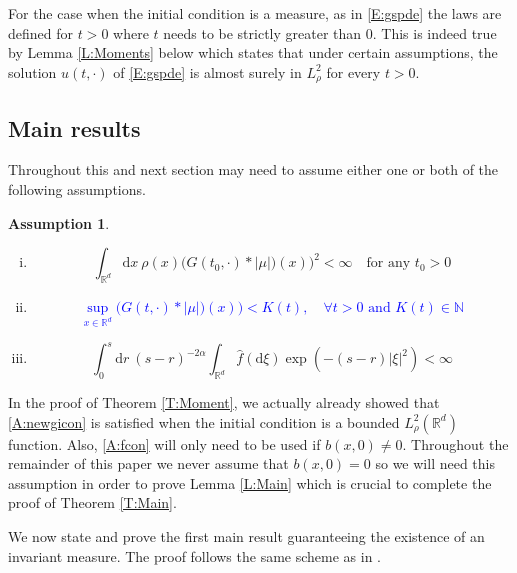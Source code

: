 \documentclass[a4paper,11pt]{article}
\numberwithin{equation}{section}
\theoremstyle{plain}
\theoremstyle{definition}
\newtheorem{assumptions}[theorem]{Assumption}
\newcommand{\R}{\mathbb{R}}
\newcommand{\ud}{\ensuremath{\mathrm{d}}}
\begin{document}
For the case when the initial condition is a measure, as in \eqref{E:gspde} the laws are defined for $t>0$ where $t$ needs to be strictly greater than $0$. This is indeed true by Lemma \ref{L:Moments}  below which states that under certain assumptions, the solution $u(t,\cdot)$ of \eqref{E:gspde} is almost surely in $L^2_{\rho}$ for every $t>0$. 


\subsection{Main results} 
Throughout this and next section may need to assume either one or both of the following assumptions. 

\begin{assumptions} $\;$
	\begin{enumerate}[(i)]
		\item \begin{equation} 
					\int_{\R^d}\ud x \: \rho(x)\big(G(t_0,\cdot)*|\mu|)(x) \big)^2 < \infty \quad \text{for any $t_0 >0$} \label{A:gicon} 
				\end{equation}
				
		\item \textcolor{blue}{\begin{equation} 
				\sup_{x\in \R^d}	\big(G(t,\cdot)*|\mu|)(x) \big) < K(t), \quad \forall t>0 \text{ and } K(t)\in \mathbb N \label{A:newgicon}
  			   	\end{equation}
  			   }
		
		\item \begin{equation}
					\int_0^s \ud r \: (s-r)^{-2\alpha} \int_{\R^{d}} \hat f(\ud \xi) \exp\left(-(s-r)|\xi|^2 \right) < \infty \label{A:fcon} 
				\end{equation} 	
	\end{enumerate}
\end{assumptions}

In the proof of Theorem \ref{T:Moment}, we actually already showed that \eqref{A:newgicon} is satisfied when the initial condition is a bounded $L^2_\rho(\R^d)$ function. Also, \eqref{A:fcon} will only need to be used if $b(x,0) \not = 0$. Throughout the remainder of this paper we never assume that $b(x,0) = 0$ so we will need this assumption in order to prove  Lemma \ref{L:Main} which is crucial to complete the proof of Theorem \ref{T:Main}. 

We now state and prove the first main result guaranteeing the existence of an invariant measure. The proof follows the same scheme as in \cite{TessitoreZabczyk98M}.\\
\end{document}
